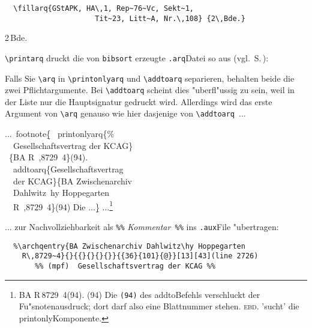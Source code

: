 \documentclass[12pt,a4paper]{article}
\newcommand{\pbs}{\string\ \unskip}
\newcommand{\bs}{\protect\pbs}
\begin{document}
\vspace{-.25ex}\noindent
{\small
\begin{verbatim}
  \fillarq{GStAPK, HA\,1, Rep~76~Vc, Sekt~1, 
                     Tit~23, Litt~A, Nr.\,108} {2\,Bde.}
\end{verbatim}}
   {2\,Bde.}


\vspace{-.25ex}\noindent
\verb|\printarq| druckt die von \verb|bibsort| erzeugte 
\verb|.arq|\hy Datei so aus (vgl.\ S.\,\pageref{newpage}):

\vfill
\printarq


\newpage
Falls Sie \verb|\arq| in \verb|\printonlyarq| und \verb|\addtoarq| 
separieren, behalten beide die zwei Pflichtargumente. 
Bei \verb|\addtoarq| scheint dies "uberfl"ussig zu sein, weil in 
der Liste nur die Hauptsignatur gedruckt wird. Allerdings wird 
das erste Argument von \verb|\arq| genauso wie hier dasjenige von 
\verb|\addtoarq|~...

\Doppelbox
{
...\bs footnote\b{\{} \bs printonlyarq\{\% 
\\ \ \ Gesellschaftsvertrag der KCAG\} 
\\ \ \{BA R\bs ,8729\string~4\}(94). 
\\[.25ex] \ \bs addtoarq\{Gesellschaftsvertrag 
\\ \ \ der KCAG\}\{BA Zwischenarchiv 
\\ \ \ Dahlwitz\bs hy Hoppegarten 
\\ \ \ R\bs ,8729\string~4\}(94)
Die ...\b{\}}
}
{
...\footnote{  
{BA R\,8729~4}(94). 
(94)
Die \texttt{(94)} des addto\hy Befehls verschluckt der Fu"snotenausdruck;
dort darf also eine Blattnummer stehen. \textsc{ebd.} 'sucht' die
printonly\hy Komponente.}
}

\noindent
... zur Nachvollziehbarkeit als \hspace{.1em} 
{\small\verb|%%| \textit{Kommentar}\verb| %%|} 
\hspace{.1em} ins \verb|.aux|\hy File "ubertragen:

\vspace{-.5ex}
{\footnotesize\begin{verbatim}
  %\archqentry{BA Zwischenarchiv Dahlwitz\hy Hoppegarten 
    R\,8729~4}{}{{}{}{}{}}{{36}{101}{@}}[13][43](line 2726)
       %% (mpf)  Gesellschaftsvertrag der KCAG %%
\end{verbatim}}
\end{document}
